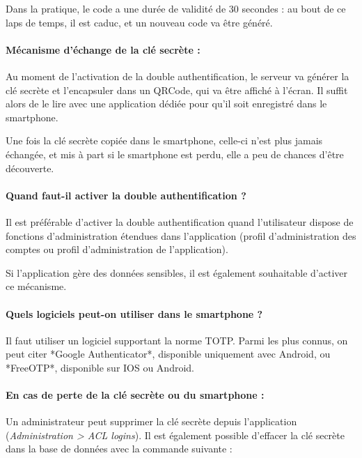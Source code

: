 Dans la pratique, le code a une durée de validité de 30 secondes : au bout de ce laps de temps, il est caduc, et un nouveau code va être généré.

\paragraph{Mécanisme d'échange de la clé secrète :}

Au moment de l'activation de la double authentification, le serveur va générer la clé secrète et l'encapsuler dans un QRCode, qui va être affiché à l'écran. Il suffit alors de le lire avec une application dédiée pour qu'il soit enregistré dans le smartphone.

Une fois la clé secrète copiée dans le smartphone, celle-ci n'est plus jamais échangée, et mis à part si le smartphone est perdu, elle a peu de chances d'être découverte.

\paragraph{Quand faut-il activer la double authentification ?}

Il est préférable d'activer la double authentification quand l'utilisateur dispose de fonctions d'administration étendues dans l'application (profil d'administration des comptes ou profil d'administration de l'application). 

Si l'application gère des données sensibles, il est également souhaitable d'activer ce mécanisme.

\paragraph{Quels logiciels peut-on utiliser dans le smartphone ?}

Il faut utiliser un logiciel supportant la norme TOTP. Parmi les plus connus, on peut citer *Google Authenticator*, disponible uniquement avec Android, ou *FreeOTP*, disponible sur IOS ou Android.

\paragraph{En cas de perte de la clé secrète ou du smartphone :}

Un administrateur peut supprimer la clé secrète depuis l'application (\textit{Administration > ACL logins}). Il est également possible d'effacer la clé secrète dans la base de données avec la commande suivante :

